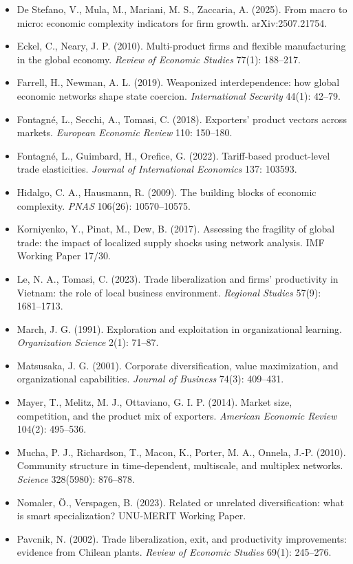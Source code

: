 \documentclass[11pt]{article}
\begin{document}
\begin{itemize}[leftmargin=1.4em,labelsep=0.4em]
  \item De Stefano, V., Mula, M., Mariani, M. S., Zaccaria, A. (2025). From macro to micro: economic complexity indicators for firm growth. arXiv:2507.21754.
  \item Eckel, C., Neary, J. P. (2010). Multi-product firms and flexible manufacturing in the global economy. \emph{Review of Economic Studies} 77(1): 188--217.
  \item Farrell, H., Newman, A. L. (2019). Weaponized interdependence: how global economic networks shape state coercion. \emph{International Security} 44(1): 42--79.
  \item Fontagn\'e, L., Secchi, A., Tomasi, C. (2018). Exporters' product vectors across markets. \emph{European Economic Review} 110: 150--180.
  \item Fontagn\'e, L., Guimbard, H., Orefice, G. (2022). Tariff-based product-level trade elasticities. \emph{Journal of International Economics} 137: 103593.
  \item Hidalgo, C. A., Hausmann, R. (2009). The building blocks of economic complexity. \emph{PNAS} 106(26): 10570--10575.
  \item Korniyenko, Y., Pinat, M., Dew, B. (2017). Assessing the fragility of global trade: the impact of localized supply shocks using network analysis. IMF Working Paper 17/30.
  \item Le, N. A., Tomasi, C. (2023). Trade liberalization and firms' productivity in Vietnam: the role of local business environment. \emph{Regional Studies} 57(9): 1681--1713.
  \item March, J. G. (1991). Exploration and exploitation in organizational learning. \emph{Organization Science} 2(1): 71--87.
  \item Matsusaka, J. G. (2001). Corporate diversification, value maximization, and organizational capabilities. \emph{Journal of Business} 74(3): 409--431.
  \item Mayer, T., Melitz, M. J., Ottaviano, G. I. P. (2014). Market size, competition, and the product mix of exporters. \emph{American Economic Review} 104(2): 495--536.
  \item Mucha, P. J., Richardson, T., Macon, K., Porter, M. A., Onnela, J.-P. (2010). Community structure in time-dependent, multiscale, and multiplex networks. \emph{Science} 328(5980): 876--878.
  \item Nomaler, \"O., Verspagen, B. (2023). Related or unrelated diversification: what is smart specialization? UNU-MERIT Working Paper.
  \item Pavcnik, N. (2002). Trade liberalization, exit, and productivity improvements: evidence from Chilean plants. \emph{Review of Economic Studies} 69(1): 245--276.

\end{itemize}
\end{document}
